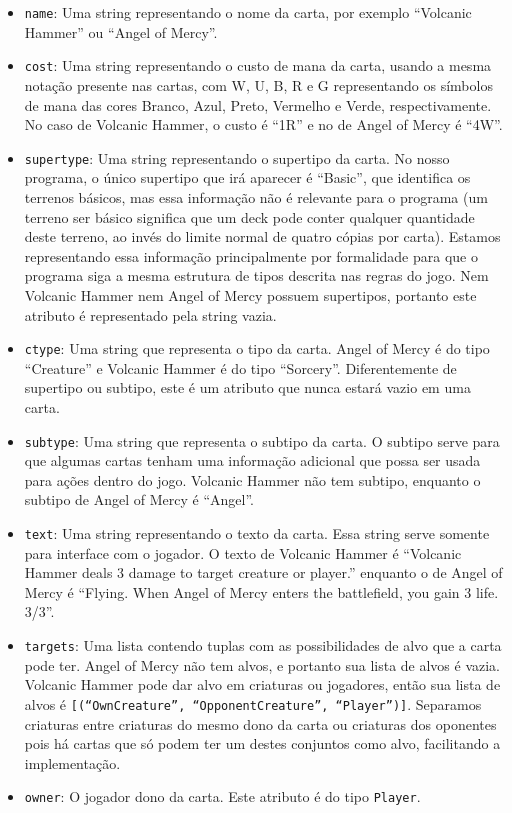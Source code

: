 \begin{itemize}
  \item\texttt{name}: Uma string representando o nome da carta, por exemplo ``Volcanic Hammer''
  ou ``Angel of Mercy''.
  \item\texttt{cost}: Uma string representando o custo de mana da carta, usando a mesma notação
  presente nas cartas, com W, U, B, R e G representando os símbolos de mana das cores Branco,
  Azul, Preto, Vermelho e Verde, respectivamente. No caso de Volcanic Hammer, o custo é ``1R''
  e no de Angel of Mercy é ``4W''.
  \item\texttt{supertype}: Uma string representando o supertipo da carta. No nosso programa,
  o único supertipo que irá aparecer é ``Basic'', que identifica os terrenos básicos, mas essa
  informação não é relevante para o programa (um terreno ser básico significa que um deck pode
  conter qualquer quantidade deste terreno, ao invés do limite normal de quatro cópias por carta).
  Estamos representando essa informação principalmente por formalidade para que o programa siga a
  mesma estrutura de tipos descrita nas regras do jogo. Nem Volcanic Hammer nem Angel of Mercy
  possuem supertipos, portanto este atributo é representado pela string vazia.
  \item\texttt{ctype}: Uma string que representa o tipo da carta. Angel of Mercy é do tipo
  ``Creature'' e Volcanic Hammer é do tipo ``Sorcery''. Diferentemente de supertipo ou subtipo,
  este é um atributo que nunca estará vazio em uma carta.
  \item\texttt{subtype}: Uma string que representa o subtipo da carta. O subtipo serve para que
  algumas cartas tenham uma informação adicional que possa ser usada para ações dentro do jogo.
  Volcanic Hammer não tem subtipo, enquanto o subtipo de Angel of Mercy é ``Angel''.
  \item\texttt{text}: Uma string representando o texto da carta. Essa string serve somente para
  interface com o jogador. O texto de Volcanic Hammer é ``Volcanic Hammer deals 3 damage to target
  creature or player.'' enquanto o de Angel of Mercy é ``Flying. When Angel of Mercy enters the
  battlefield, you gain 3 life. 3/3''.
  \item\texttt{targets}: Uma lista contendo tuplas com as possibilidades de alvo que a carta
  pode ter. Angel of Mercy não tem alvos, e portanto sua lista de alvos é vazia. Volcanic Hammer
  pode dar alvo em criaturas ou jogadores, então sua lista de alvos é
  \texttt{[(``OwnCreature'', ``OpponentCreature'', ``Player'')]}. Separamos criaturas  entre
  criaturas do mesmo dono da carta ou criaturas dos oponentes pois há cartas que só podem ter
  um destes conjuntos como alvo, facilitando a implementação.
  \item\texttt{owner}: O jogador dono da carta. Este atributo é do tipo \texttt{Player}.
\end{itemize}
